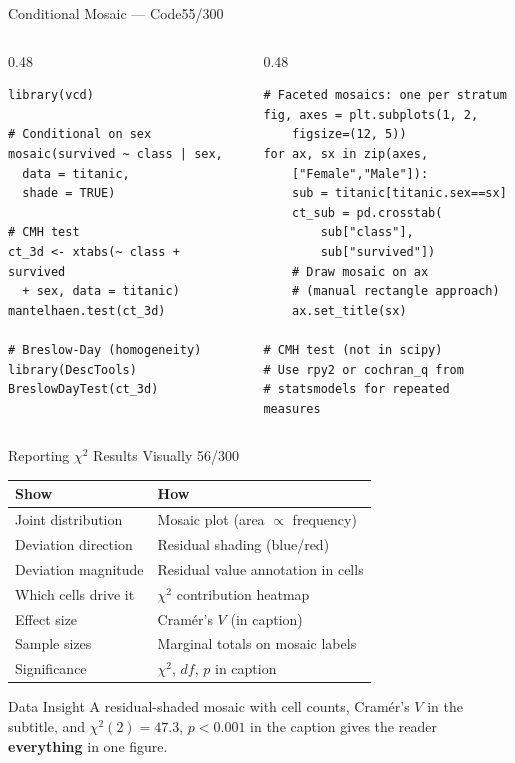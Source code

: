 \documentclass[10pt]{beamer}
\newcommand{\smark}[1]{\hfill{\scriptsize\color{codegray}#1}}
\begin{document}
\begin{frame}[fragile]{Conditional Mosaic --- Code}\smark{55/300}
\begin{columns}[T]
\begin{column}{0.48\textwidth}
\begin{lstlisting}[style=Rstyle]
library(vcd)

# Conditional on sex
mosaic(survived ~ class | sex,
  data = titanic,
  shade = TRUE)

# CMH test
ct_3d <- xtabs(~ class + survived
  + sex, data = titanic)
mantelhaen.test(ct_3d)

# Breslow-Day (homogeneity)
library(DescTools)
BreslowDayTest(ct_3d)
\end{lstlisting}
\end{column}
\begin{column}{0.48\textwidth}
\begin{lstlisting}[style=Pystyle]
# Faceted mosaics: one per stratum
fig, axes = plt.subplots(1, 2,
    figsize=(12, 5))
for ax, sx in zip(axes,
    ["Female","Male"]):
    sub = titanic[titanic.sex==sx]
    ct_sub = pd.crosstab(
        sub["class"],
        sub["survived"])
    # Draw mosaic on ax
    # (manual rectangle approach)
    ax.set_title(sx)

# CMH test (not in scipy)
# Use rpy2 or cochran_q from
# statsmodels for repeated measures
\end{lstlisting}
\end{column}
\end{columns}
\end{frame}

\begin{frame}{Reporting $\chi^2$ Results Visually}
\smark{56/300}
\centering\small
\begin{tabular}{@{}ll@{}}
    \toprule
    \textbf{Show} & \textbf{How} \\
    \midrule
    Joint distribution    & Mosaic plot (area $\propto$ frequency) \\
    Deviation direction   & Residual shading (blue/red) \\
    Deviation magnitude   & Residual value annotation in cells \\
    Which cells drive it  & $\chi^2$ contribution heatmap \\
    Effect size           & Cramér's $V$ (in caption) \\
    Sample sizes          & Marginal totals on mosaic labels \\
    Significance          & $\chi^2$, $df$, $p$ in caption \\
    \bottomrule
\end{tabular}

\vspace{0.3cm}
\begin{exampleblock}{Data Insight}
    \scriptsize A residual-shaded mosaic with cell counts, Cramér's $V$ in the subtitle, and $\chi^2(2) = 47.3$, $p < 0.001$ in the caption gives the reader \textbf{everything} in one figure.
\end{exampleblock}
\end{frame}
\end{document}
